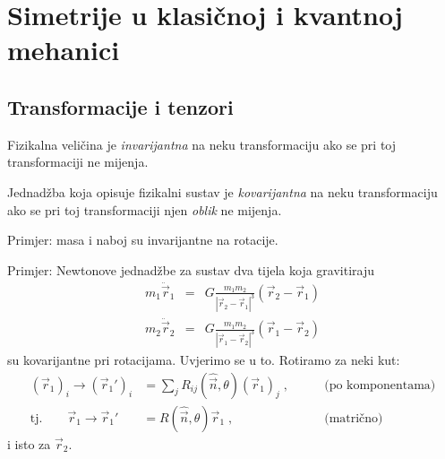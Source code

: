 
\chapter{Simetrije u klasičnoj i kvantnoj mehanici}
\label{ch:klasicna}

\section{Transformacije i tenzori}

\begin{definicija}
Fizikalna veličina je \emph{invarijantna} na neku transformaciju ako se
pri toj transformaciji ne mijenja.

Jednadžba koja opisuje fizikalni sustav je \emph{kovarijantna}
na neku transformaciju ako se pri toj transformaciji 
njen \emph{oblik} ne mijenja.
\end{definicija}

Primjer: masa i naboj su invarijantne na rotacije.

Primjer: Newtonove jednadžbe za sustav dva tijela koja gravitiraju
\begin{eqnarray}
 m_1 \ddot{\vec{r}}_1 & = & G \frac{m_1 m_2}{|\vec{r}_2 - \vec{r}_1|^3}
    (\vec{r}_2 - \vec{r}_1) \label{eq:newton1} \\
 m_2 \ddot{\vec{r}}_2 & = & G \frac{m_1 m_2}{|\vec{r}_1 - \vec{r}_2|^3}
    (\vec{r}_1 - \vec{r}_2)
\end{eqnarray}
su kovarijantne pri rotacijama. Uvjerimo se u to.
Rotiramo za neki kut:
\begin{align*}
(\vec{r}_{1})_i \to (\vec{r}_{1}')_i &= \sum_j R_{ij}(\hat{\vec{n}},\theta) 
   (\vec{r}_{1})_j \;, \qquad& \text{(po komponentama)}\\
\text{tj.}\qquad \vec{r}_{1}\to \vec{r}_{1}' &= R(\hat{\vec{n}},\theta) 
   \vec{r}_{1}\;, \qquad& \text{(matrično)}
\end{align*}
i isto za $\vec{r}_2$.

